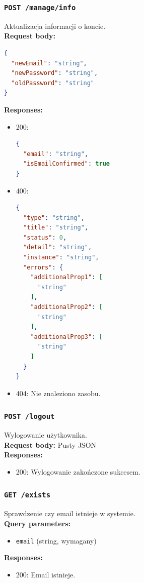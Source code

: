 \subsubsection{\lstinline[language=http]{POST /manage/info}}
Aktualizacja informacji o koncie. \\
\textbf{Request body:}
\begin{lstlisting}[language=json]
{
  "newEmail": "string",
  "newPassword": "string",
  "oldPassword": "string"
}
\end{lstlisting}
\textbf{Responses:}
\begin{itemize}
    \item 200:
\begin{lstlisting}[language=json]
{
  "email": "string",
  "isEmailConfirmed": true
}
\end{lstlisting}
    \item 400:
\begin{lstlisting}[language=json]
{
  "type": "string",
  "title": "string",
  "status": 0,
  "detail": "string",
  "instance": "string",
  "errors": {
    "additionalProp1": [
      "string"
    ],
    "additionalProp2": [
      "string"
    ],
    "additionalProp3": [
      "string"
    ]
  }
}
\end{lstlisting}
    \item 404: Nie znaleziono zasobu.
\end{itemize}

\subsubsection{\lstinline[language=http]{POST /logout}}
Wylogowanie użytkownika. \\
\textbf{Request body:} Pusty JSON \\
\textbf{Responses:}
\begin{itemize}
    \item 200: Wylogowanie zakończone sukcesem.
\end{itemize}

\subsubsection{\lstinline[language=http]{GET /exists}}
Sprawdzenie czy email istnieje w systemie. \\
\textbf{Query parameters:}
\begin{itemize}
    \item \texttt{email} (string, wymagany)
\end{itemize}
\textbf{Responses:}
\begin{itemize}
    \item 200: Email istnieje.
\end{itemize}

